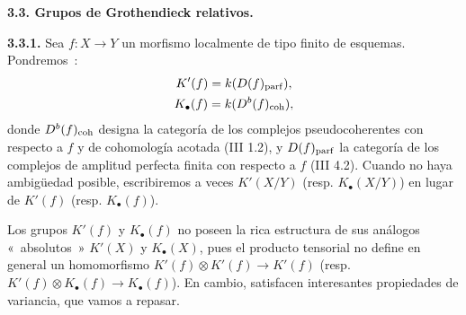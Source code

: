 \providecommand{\sisi}[2]{#2}

\textbf{3.3. Grupos de Grothendieck relativos.}

\textbf{3.3.1.} Sea \(f:X\longrightarrow Y\) un morfismo localmente de tipo finito de esquemas. Pondremos~:
\[
\begin{gathered}
 K'(f)=k(D(f)_{\mathrm{parf}}),\\
 K_{\bullet}(f)=k(D^b(f)_{\mathrm{coh}}),
\end{gathered}
\]
donde \(D^b(f)_{\mathrm{coh}}\) designa la categoría de los complejos pseudocoherentes con respecto a \(f\) y de cohomología acotada (III 1.2), y \(D(f)_{\mathrm{parf}}\) la categoría de los complejos de amplitud perfecta finita con respecto a \(f\) (III 4.2). Cuando no haya ambigüedad posible, escribiremos a veces \(K'(X/Y)\) (resp. \(K_{\bullet}(X/Y)\)) en lugar de \(K'(f)\) (resp. \(K_{\bullet}(f)\)).

Los grupos \(K'(f)\) y \(K_{\bullet}(f)\) no poseen la rica estructura de sus análogos «~absolutos~» \(K'(X)\) y \(K_{\bullet}(X)\), pues el producto tensorial no define en general un homomorfismo \(K'(f)\otimes K'(f)\longrightarrow K'(f)\) (resp. \(K'(f)\otimes K_{\bullet}(f)\longrightarrow K_{\bullet}(f)\)). En cambio, satisfacen interesantes propiedades de variancia, que vamos a repasar.

